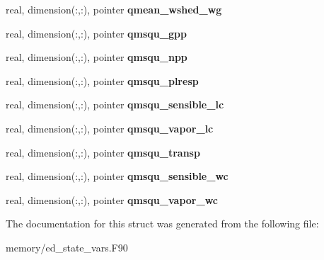 \begin{DoxyCompactItemize}
\item 
\hypertarget{structed__state__vars_1_1patchtype_aa5d649a12e0da39f4fb9c88e0ecc6b92}{
real, dimension(:,:), pointer {\bfseries qmean\_\-wshed\_\-wg}}
\label{structed__state__vars_1_1patchtype_aa5d649a12e0da39f4fb9c88e0ecc6b92}

\item 
\hypertarget{structed__state__vars_1_1patchtype_a2595cd79f148df96a44504a925f7d6f0}{
real, dimension(:,:), pointer {\bfseries qmsqu\_\-gpp}}
\label{structed__state__vars_1_1patchtype_a2595cd79f148df96a44504a925f7d6f0}

\item 
\hypertarget{structed__state__vars_1_1patchtype_a1981346f0886d59c080f62abcfa6785a}{
real, dimension(:,:), pointer {\bfseries qmsqu\_\-npp}}
\label{structed__state__vars_1_1patchtype_a1981346f0886d59c080f62abcfa6785a}

\item 
\hypertarget{structed__state__vars_1_1patchtype_ab85a1937ce0fb14474bc9b0af6af8d21}{
real, dimension(:,:), pointer {\bfseries qmsqu\_\-plresp}}
\label{structed__state__vars_1_1patchtype_ab85a1937ce0fb14474bc9b0af6af8d21}

\item 
\hypertarget{structed__state__vars_1_1patchtype_af6d1c65ee6295eee532402b8e0db570c}{
real, dimension(:,:), pointer {\bfseries qmsqu\_\-sensible\_\-lc}}
\label{structed__state__vars_1_1patchtype_af6d1c65ee6295eee532402b8e0db570c}

\item 
\hypertarget{structed__state__vars_1_1patchtype_af4ebebd6c3e3091e069140f0a55aef8c}{
real, dimension(:,:), pointer {\bfseries qmsqu\_\-vapor\_\-lc}}
\label{structed__state__vars_1_1patchtype_af4ebebd6c3e3091e069140f0a55aef8c}

\item 
\hypertarget{structed__state__vars_1_1patchtype_a955d790e09f762f53b375bf2f3ba16e7}{
real, dimension(:,:), pointer {\bfseries qmsqu\_\-transp}}
\label{structed__state__vars_1_1patchtype_a955d790e09f762f53b375bf2f3ba16e7}

\item 
\hypertarget{structed__state__vars_1_1patchtype_a68f2b095979c3fad7b6bc0c86799f73f}{
real, dimension(:,:), pointer {\bfseries qmsqu\_\-sensible\_\-wc}}
\label{structed__state__vars_1_1patchtype_a68f2b095979c3fad7b6bc0c86799f73f}

\item 
\hypertarget{structed__state__vars_1_1patchtype_a0d1c506cad61e2f0f4d15ac5f11e9aa4}{
real, dimension(:,:), pointer {\bfseries qmsqu\_\-vapor\_\-wc}}
\label{structed__state__vars_1_1patchtype_a0d1c506cad61e2f0f4d15ac5f11e9aa4}

\end{DoxyCompactItemize}


The documentation for this struct was generated from the following file:\begin{DoxyCompactItemize}
\item 
memory/ed\_\-state\_\-vars.F90\end{DoxyCompactItemize}
